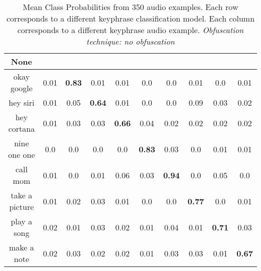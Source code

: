 
\begin{table}[!th]
\begin{tabular}{cccccccccc}%
\hline%
None&\rotate{random talk}{70}&\rotate{okay google}{70}&\rotate{hey siri}{70}&\rotate{hey cortana}{70}&\rotate{nine one one}{70}&\rotate{call mom}{70}&\rotate{take a picture}{70}&\rotate{play a song}{70}&\rotate{make a note}{70}\\%
\hline%
okay google&0.01&\textbf{0.83}&0.01&0.01&0.0&0.0&0.01&0.0&0.01\\%
hey siri&0.01&0.05&\textbf{0.64}&0.01&0.0&0.0&0.09&0.03&0.02\\%
hey cortana&0.01&0.03&0.03&\textbf{0.66}&0.04&0.02&0.02&0.02&0.02\\%
nine one one&0.0&0.0&0.0&0.0&\textbf{0.83}&0.03&0.0&0.01&0.01\\%
call mom&0.01&0.0&0.01&0.06&0.03&\textbf{0.94}&0.0&0.05&0.0\\%
take a picture&0.01&0.02&0.03&0.01&0.0&0.0&\textbf{0.77}&0.0&0.01\\%
play a song&0.02&0.01&0.03&0.02&0.01&0.04&0.01&\textbf{0.71}&0.03\\%
make a note&0.02&0.03&0.02&0.02&0.01&0.03&0.03&0.01&\textbf{0.67}\\%
\hline%
\end{tabular}
\caption{Mean Class Probabilities from 350 audio examples. Each row corresponds to a different keyphrase classification model. Each column corresponds to a different keyphrase audio example. \emph{Obfuscation technique: no obfuscation}}
\label{tab:probs_raw_audio}
\end{table}



